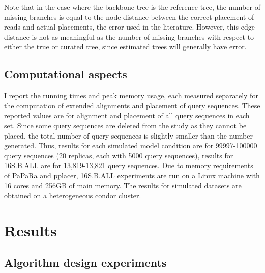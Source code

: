 Note that in the case where the backbone tree is the reference tree, 
the number of missing branches is
equal to the node distance between the correct placement of reads and
actual placements, the error used in the literature\cite{Berger2011,Matsen2010,Berger2011a}. 
However, this edge distance is not as meaningful as the 
number of missing branches with respect to either the true or
curated tree, since estimated trees will generally have error.

\subsection{ Computational aspects}
I report the running times and peak memory usage, each measured
separately for the computation of
extended alignments and placement of query sequences.
These reported values are for 
alignment and placement of all query sequences in each set.
Since some query sequences are deleted from the study as
they cannot be placed, the total number of
query sequences is slightly smaller than the number
generated.
Thus, results for each simulated model condition
are for 99997-100000 query sequences (20 replicas, each with 5000 query sequences),
results for 16S.B.ALL are for 13,819-13,821 query sequences.
Due to memory requirements of PaPaRa and pplacer, 16S.B.ALL experiments are
run on a Linux machine with 16 cores and 256GB of main memory. The results
for simulated datasets are obtained on a heterogeneous condor
cluster.
\section{Results}\label{sepp:results}
\subsection{Algorithm design experiments}


